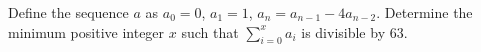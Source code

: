 Define the sequence $a$ as $a_0 = 0$, $a_1 = 1$, $a_n = a_{n-1}-4a_{n-2}$. Determine the minimum positive integer $x$ such that $\sum_{i=0}^x a_i$ is divisible by $63$.
